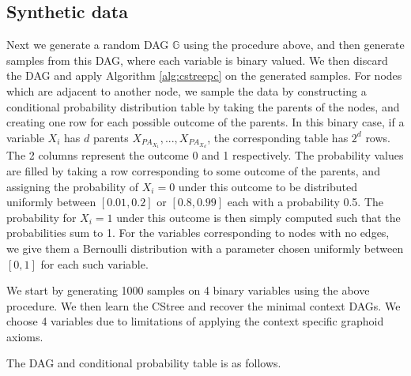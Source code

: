 \documentclass{tufte-book}
\begin{document}
\begin{Definition}
\section{Synthetic data}
\label{sec:orgbf21b5e}
Next we generate a random DAG \(\mathbb{G}\) using the procedure above, and then generate samples from this DAG, where each variable is binary valued. We then discard the DAG and apply Algorithm \ref{alg:cstreepc} on the generated samples. For nodes which are adjacent to another node, we sample the data by constructing a conditional probability distribution table by taking the parents of the nodes, and creating one row for each possible outcome of the parents. In this binary case, if a variable \(X_i\) has \(d\) parents \(X_{PA_{X_1}},...,X_{PA_{X_d}}\), the corresponding table has \(2^d\) rows. The 2 columns represent the outcome 0 and 1 respectively. The probability values are filled by taking a row corresponding to some outcome of the parents, and assigning the probability of \(X_i=0\) under this outcome to be distributed uniformly between \([0.01,0.2]\) or \([0.8,0.99]\) each with a probability 0.5. The probability for \(X_i=1\) under this outcome is then simply computed such that the probabilities sum to 1. For the variables corresponding to nodes with no edges, we give them a Bernoulli distribution with a parameter chosen uniformly between \([0,1]\) for each such variable.



We start by generating 1000 samples on 4 binary variables using the above procedure. We then learn the CStree and recover the minimal context DAGs. We choose 4 variables due to limitations of applying the context specific graphoid axioms.

The DAG and conditional probability table is as follows.



\end{Definition}
\end{document}
